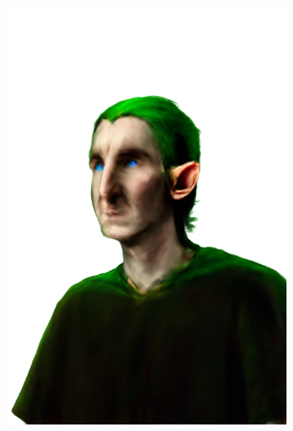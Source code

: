 \begin{figure}
\begin{subfigure}{0.18\linewidth}
		\includegraphics[width=\textwidth]{Figures/failed/igs2gs_1/34_render.png}
	\end{subfigure}
    \begin{subfigure}{0.18\linewidth}

\end{subfigure}
\end{figure}

